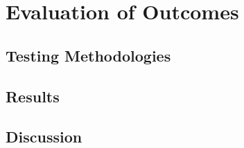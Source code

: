 %
%
\chapter{Evaluation of Outcomes}

\section{Testing Methodologies}

\section{Results}

\section{Discussion}

\clearpage